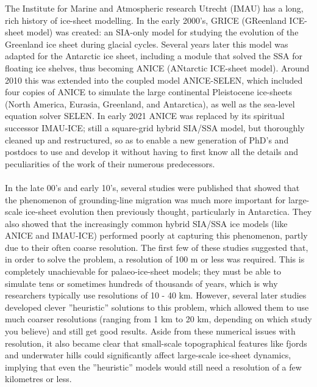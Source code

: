 \documentclass{article}
\begin{document}
The Institute for Marine and Atmospheric research Utrecht (IMAU) has a long, rich history of ice-sheet modelling. In the early 2000's, GRICE (GReenland ICE-sheet model) was created: an SIA-only model   for studying the evolution of the Greenland ice sheet during glacial cycles. Several years later this model was adapted for the Antarctic ice sheet, including a module that solved the SSA for floating ice shelves, thus becoming ANICE (ANtarctic ICE-sheet model). Around 2010 this was extended into the coupled model ANICE-SELEN, which included four copies of ANICE to simulate the large continental Pleistocene ice-sheets (North America, Eurasia, Greenland, and Antarctica), as well as the sea-level equation solver SELEN. In early 2021 ANICE was replaced by its spiritual successor IMAU-ICE; still a square-grid hybrid SIA/SSA model, but thoroughly cleaned up and restructured, so as to enable a new generation of PhD's and postdocs to use and develop it without having to first know all the details and peculiarities of the work of their numerous predecessors.\\
\\
In the late 00's and early 10's, several studies were published that showed that the phenomenon of grounding-line migration was much more important for large-scale ice-sheet evolution then previously thought, particularly in Antarctica. They also showed that the increasingly common hybrid SIA/SSA ice models (like ANICE and IMAU-ICE) performed poorly at capturing this phenomenon, partly due to their often coarse resolution. The first few of these studies suggested that, in order to solve the problem, a resolution of 100 m or less was required. This is completely unachievable for palaeo-ice-sheet models; they must be able to simulate tens or sometimes hundreds of thousands of years, which is why researchers typically use resolutions of 10 - 40 km. However, several later studies developed clever ''heuristic'' solutions to this problem, which allowed them to use much coarser resolutions (ranging from 1 km to 20 km, depending on which study you believe) and still get good results. Aside from these numerical issues with resolution, it also became clear that small-scale topographical features like fjords and underwater hills could significantly affect large-scale ice-sheet dynamics, implying that even the ''heuristic'' models would still need a resolution of a few kilometres or less.\\
\\
\end{document}

